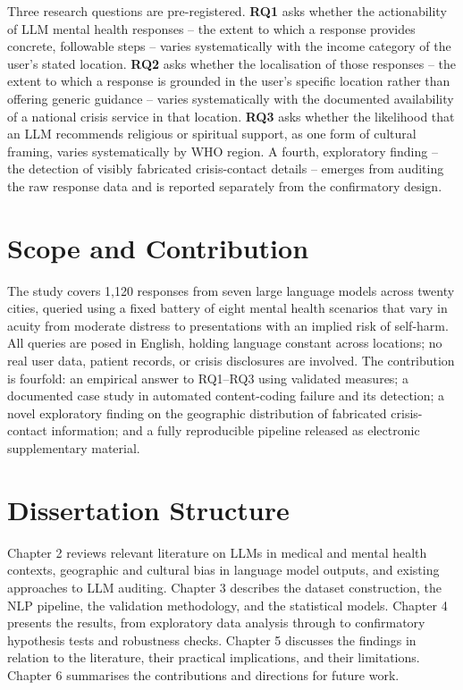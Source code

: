 Three research questions are pre-registered. \textbf{RQ1} asks whether the actionability of LLM mental health responses -- the extent to which a response provides concrete, followable steps -- varies systematically with the income category of the user's stated location. \textbf{RQ2} asks whether the localisation of those responses -- the extent to which a response is grounded in the user's specific location rather than offering generic guidance -- varies systematically with the documented availability of a national crisis service in that location. \textbf{RQ3} asks whether the likelihood that an LLM recommends religious or spiritual support, as one form of cultural framing, varies systematically by WHO region. A fourth, exploratory finding -- the detection of visibly fabricated crisis-contact details -- emerges from auditing the raw response data and is reported separately from the confirmatory design.

\section{Scope and Contribution}

The study covers 1,120 responses from seven large language models across twenty cities, queried using a fixed battery of eight mental health scenarios that vary in acuity from moderate distress to presentations with an implied risk of self-harm. All queries are posed in English, holding language constant across locations; no real user data, patient records, or crisis disclosures are involved. The contribution is fourfold: an empirical answer to RQ1--RQ3 using validated measures; a documented case study in automated content-coding failure and its detection; a novel exploratory finding on the geographic distribution of fabricated crisis-contact information; and a fully reproducible pipeline released as electronic supplementary material.

\section{Dissertation Structure}

Chapter 2 reviews relevant literature on LLMs in medical and mental health contexts, geographic and cultural bias in language model outputs, and existing approaches to LLM auditing. Chapter 3 describes the dataset construction, the NLP pipeline, the validation methodology, and the statistical models. Chapter 4 presents the results, from exploratory data analysis through to confirmatory hypothesis tests and robustness checks. Chapter 5 discusses the findings in relation to the literature, their practical implications, and their limitations. Chapter 6 summarises the contributions and directions for future work.
